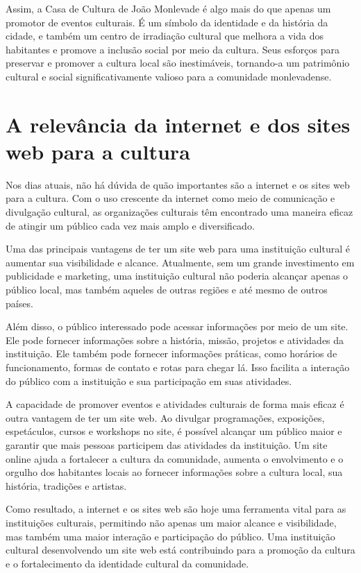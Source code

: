 Assim, a Casa de Cultura de João Monlevade é algo mais do que apenas um promotor de eventos culturais. É um símbolo da identidade e da história da cidade, e também um centro de irradiação cultural que melhora a vida dos habitantes e promove a inclusão social por meio da cultura. Seus esforços para preservar e promover a cultura local são inestimáveis, tornando-a um patrimônio cultural e social significativamente valioso para a comunidade monlevadense.


\section{A relevância da internet e dos sites web para a cultura}
Nos dias atuais, não há dúvida de quão importantes são a internet e os sites web para a cultura. Com o uso crescente da internet como meio de comunicação e divulgação cultural, as organizações culturais têm encontrado uma maneira eficaz de atingir um público cada vez mais amplo e diversificado.

Uma das principais vantagens de ter um site web para uma instituição cultural é aumentar sua visibilidade e alcance. Atualmente, sem um grande investimento em publicidade e marketing, uma instituição cultural não poderia alcançar apenas o público local, mas também aqueles de outras regiões e até mesmo de outros países.

Além disso, o público interessado pode acessar informações por meio de um site. Ele pode fornecer informações sobre a história, missão, projetos e atividades da instituição. Ele também pode fornecer informações práticas, como horários de funcionamento, formas de contato e rotas para chegar lá. Isso facilita a interação do público com a instituição e sua participação em suas atividades.

A capacidade de promover eventos e atividades culturais de forma mais eficaz é outra vantagem de ter um site web. Ao divulgar programações, exposições, espetáculos, cursos e workshops no site, é possível alcançar um público maior e garantir que mais pessoas participem das atividades da instituição. Um site online ajuda a fortalecer a cultura da comunidade, aumenta o envolvimento e o orgulho dos habitantes locais ao fornecer informações sobre a cultura local, sua história, tradições e artistas.

Como resultado, a internet e os sites web são hoje uma ferramenta vital para as instituições culturais, permitindo não apenas um maior alcance e visibilidade, mas também uma maior interação e participação do público. Uma instituição cultural desenvolvendo um site web está contribuindo para a promoção da cultura e o fortalecimento da identidade cultural da comunidade.

